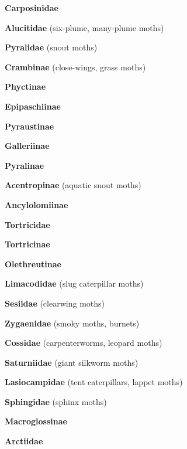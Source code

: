 \documentclass[letterpaper,10pt]{article}
\begin{document}
{\makebox[0.6cm]{}  \textbf{Carposinidae} \par
\makebox[0.6cm]{}  \textbf{Alucitidae} (six-plume, many-plume moths) \par
\makebox[0.6cm]{}  \textbf{Pyralidae} (snout moths) \par
\makebox[0.8cm]{}  \textbf{Crambinae} (close-wings, grass moths) \par
\makebox[0.8cm]{}  \textbf{Phyctinae} \par
\makebox[0.8cm]{}  \textbf{Epipaschiinae} \par
\makebox[0.8cm]{}  \textbf{Pyraustinae} \par
\makebox[0.8cm]{}  \textbf{Galleriinae} \par
\makebox[0.8cm]{}  \textbf{Pyralinae} \par
\makebox[0.8cm]{}  \textbf{Acentropinae} (aquatic snout moths) \par
\makebox[0.8cm]{}  \textbf{Ancylolomiinae} \par
\makebox[0.6cm]{}  \textbf{Tortricidae} \par
\makebox[0.8cm]{}  \textbf{Tortricinae} \par
\makebox[0.8cm]{}  \textbf{Olethreutinae} \par
\makebox[0.6cm]{}  \textbf{Limacodidae} (slug caterpillar moths) \par
\makebox[0.6cm]{}  \textbf{Sesiidae} (clearwing moths) \par
\makebox[0.6cm]{}  \textbf{Zygaenidae} (smoky moths, burnets) \par
\makebox[0.6cm]{}  \textbf{Cossidae} (carpenterworms, leopard moths) \par
\makebox[0.6cm]{}  \textbf{Saturniidae} (giant silkworm moths) \par
\makebox[0.6cm]{}  \textbf{Lasiocampidae} (tent caterpillars, lappet moths) \par
\makebox[0.6cm]{}  \textbf{Sphingidae} (sphinx moths) \par
\makebox[0.8cm]{}  \textbf{Macroglossinae} \par
\makebox[0.6cm]{}  \textbf{Arctiidae} \par
}
\end{document}
